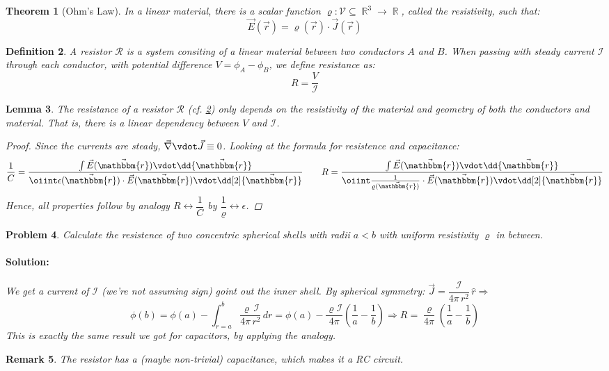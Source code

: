 \documentclass[12pt]{article}
\let\RA\Rightarrow
\renewcommand{\div}{\vec{\nabla}\vdot}
\DeclareMathOperator{\R}{\mathbb{R}}
\newcommand*{\rv}{\vec{r}}
\newcommand*{\irv}{\vec{\mathbbm{r}}}
\newcommand*{\vE}{\vec{E}}
\newcommand*{\vJ}{\vec{J}}
\newcommand*{\vol}{\mathcal{V}}
\newcommand*{\I}{\mathcal{I}}
\newtheorem{theorem}{Theorem}[subsection]
\newtheorem{definition}[theorem]{Definition}
\newtheorem{lemma}[theorem]{Lemma}
\newtheorem{remark}[theorem]{Remark}
\newtheorem{problem}[theorem]{Problem}
\newenvironment{solution}{\paragraph{Solution:}}{\hfill}
\begin{document}
\begin{theorem}[Ohm's Law]
  \label{ohm_law}
  In a linear material, there is a scalar function $\varrho:\vol\subseteq\R^3\to\R$, called the resistivity, such that: $$\vE(\rv)=\varrho(\rv)\cdot\vJ(\rv)$$
\end{theorem}

\begin{definition}
  \label{def_resistor}
  A resistor $\mathcal{R}$ is a system consiting of a linear material between two conductors $A$ and $B$. When passing with steady current $\I$ through each conductor, with potential difference $V=\phi_A-\phi_B$, we define resistance as: $$R=\frac{V}{\I}$$
\end{definition}

\begin{lemma}
  The resistance of a resistor $\mathcal{R}$ (cf. \ref{def_resistor}) only depends on the resistivity of the material and geometry of both the conductors and material. That is, there is a linear dependency between $V$ and $\I$.
  \begin{proof}
    Since the currents are steady, $\div\vJ\equiv 0$. Looking at the formula for resistence and capacitance:
    $$\dfrac{1}{C}=\dfrac{\int\vE(\irv)\vdot\dd{\irv}}{\oiint\epsilon(\irv)\cdot\vE(\irv)\vdot\dd[2]{\irv}}\qquad R=\dfrac{\int\vE(\irv)\vdot\dd{\irv}}{\oiint\frac{1}{\varrho(\irv)}\cdot\vE(\irv)\vdot\dd[2]{\irv}}$$
    Hence, all properties follow by analogy $R\leftrightarrow \dfrac{1}{C}$ by $\dfrac{1}{\varrho}\leftrightarrow\epsilon$.
  \end{proof}
\end{lemma}

\begin{problem}
  Calculate the resistence of two concentric spherical shells with radii $a<b$ with uniform resistivity $\varrho$ in between.
  \begin{solution}
    We get a current of $\I$ (we're not assuming sign) goint out the inner shell. By spherical symmetry: $\vJ=\dfrac{\I}{4\pi\,r^2}\,\hat{r}\RA$ $$\phi(b)=\phi(a)-\int_{r=a}^b\dfrac{\varrho\,\I}{4\pi\,r^2}\,dr=\phi(a)-\dfrac{\varrho\I}{4\pi}\left(\frac{1}{a}-\frac{1}{b}\right)\RA R=\frac{\varrho}{4\pi}\left(\frac{1}{a}-\frac{1}{b}\right)$$
    This is exactly the same result we got for capacitors, by applying the analogy.
  \end{solution}
\end{problem}

\begin{remark}
  The resistor has a (maybe non-trivial) capacitance, which makes it a RC circuit.
\end{remark}
\end{document}
